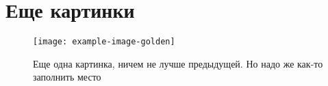 \chapter{Еще картинки}
\label{cha:appendix2}

\blindtext

\begin{figure}
    \centering
    \texttt{[image: example-image-golden]}
    \caption{Еще одна картинка, ничем не лучше предыдущей. Но надо же как-то заполнить место}
\end{figure}
